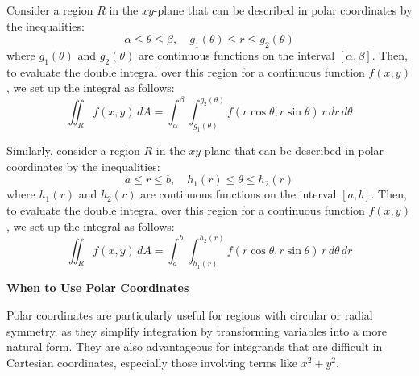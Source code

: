 \documentclass[11pt]{report}
\begin{document}
\begin{definition}
    Consider a region $R$ in the $xy$-plane that can be described in polar coordinates by the inequalities:
    \begin{equation}
        \alpha \le \theta \le \beta, \quad g_1(\theta) \le r \le g_2(\theta)
    \end{equation}
    where $g_1(\theta)$ and $g_2(\theta)$ are continuous functions on the interval $[\alpha, \beta]$. Then, to evaluate the double integral over this region for a continuous function $f(x,y)$, we set up the integral as follows:
    \begin{equation}
        \iint_R f(x,y) \, dA = \int_\alpha^\beta \int_{g_1(\theta)}^{g_2(\theta)} f(r \cos{\theta}, r \sin{\theta}) \, r \, dr \, d\theta
    \end{equation}
\end{definition}

\begin{definition}
    Similarly, consider a region $R$ in the $xy$-plane that can be described in polar coordinates by the inequalities:
    $$
        a \le r \le b, \quad h_1(r) \le \theta \le h_2(r)
    $$
    where $h_1(r)$ and $h_2(r)$ are continuous functions on the interval $[a, b]$. Then, to evaluate the double integral over this region for a continuous function $f(x,y)$, we set up the integral as follows:
    \begin{equation}
        \iint_R f(x,y) \, dA = \int_a^b \int_{h_1(r)}^{h_2(r)} f(r \cos{\theta}, r \sin{\theta}) \, r \, d\theta \, dr
    \end{equation}
\end{definition}

\begin{shaded}
    \textbf{When to Use Polar Coordinates}
    
    Polar coordinates are particularly useful for regions with circular or radial symmetry, as they simplify integration by transforming variables into a more natural form. They are also advantageous for integrands that are difficult in Cartesian coordinates, especially those involving terms like $x^2 + y^2$.
\end{shaded}
\end{document}
